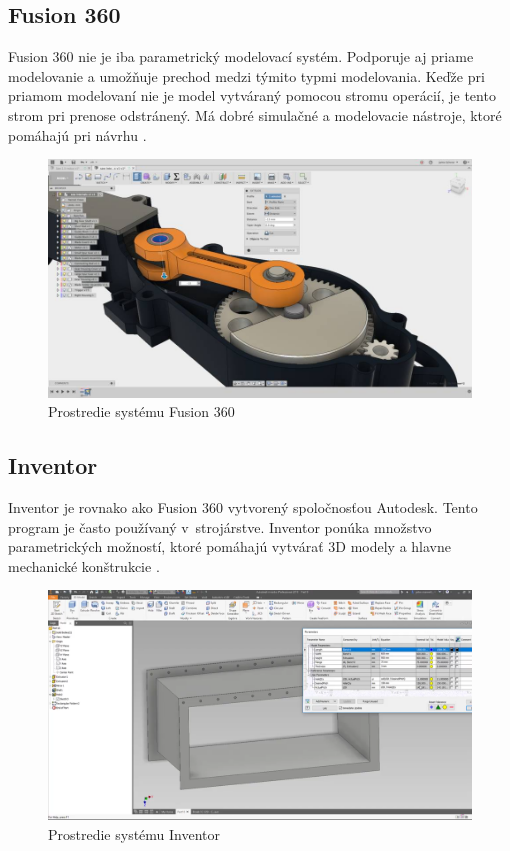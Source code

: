 \subsection*{Fusion 360}
Fusion 360 nie je iba  parametrický modelovací systém. Podporuje aj priame modelovanie a umožňuje prechod medzi týmito typmi modelovania. Keďže pri priamom modelovaní nie je model vytváraný pomocou stromu operácií, je tento strom pri prenose odstránený. Má dobré simulačné a modelovacie nástroje, ktoré pomáhajú pri návrhu \cite{gaget_2018}.\nopagebreak
\begin{figure}[H]
    \centering
    \includegraphics[width = 0.5\linewidth]{obrazky-figures/programs/Fusion.jpg}
    \caption{Prostredie systému Fusion 360  \cite{gaget_2018} }
    \label{fig:Fusion}
\end{figure}

\subsection*{Inventor}
Inventor je rovnako ako Fusion 360 vytvorený spoločnosťou Autodesk. Tento program je často používaný v~strojárstve. Inventor ponúka množstvo parametrických možností, ktoré pomáhajú vytvárať 3D modely a hlavne mechanické konštrukcie \cite{gaget_2018}.\nopagebreak
\begin{figure}[H]
    \centering
    \includegraphics[width = 0.5\linewidth]{obrazky-figures/programs/Inventor.png}
    \caption{Prostredie systému Inventor \protect\footnotemark 
    }
    \label{fig:Inventor}
\end{figure}
\pagebreak
{}


















